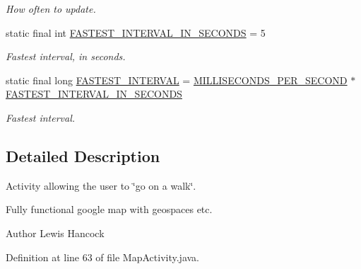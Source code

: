 \begin{DoxyCompactItemize}
\begin{DoxyCompactList}\small\item\em How often to update. \end{DoxyCompactList}\item 
static final int \hyperlink{classuk_1_1ac_1_1swan_1_1digitaltrails_1_1activities_1_1_map_activity_aecc6dab284cde100b271b4247c3ce99a}{F\+A\+S\+T\+E\+S\+T\+\_\+\+I\+N\+T\+E\+R\+V\+A\+L\+\_\+\+I\+N\+\_\+\+S\+E\+C\+O\+N\+D\+S} = 5
\begin{DoxyCompactList}\small\item\em Fastest interval, in seconds. \end{DoxyCompactList}\item 
static final long \hyperlink{classuk_1_1ac_1_1swan_1_1digitaltrails_1_1activities_1_1_map_activity_a76841fbf67877d014b59ce522302003d}{F\+A\+S\+T\+E\+S\+T\+\_\+\+I\+N\+T\+E\+R\+V\+A\+L} = \hyperlink{classuk_1_1ac_1_1swan_1_1digitaltrails_1_1activities_1_1_map_activity_a91c817713b70954a38dd441d84c3e63c}{M\+I\+L\+L\+I\+S\+E\+C\+O\+N\+D\+S\+\_\+\+P\+E\+R\+\_\+\+S\+E\+C\+O\+N\+D} $\ast$ \hyperlink{classuk_1_1ac_1_1swan_1_1digitaltrails_1_1activities_1_1_map_activity_aecc6dab284cde100b271b4247c3ce99a}{F\+A\+S\+T\+E\+S\+T\+\_\+\+I\+N\+T\+E\+R\+V\+A\+L\+\_\+\+I\+N\+\_\+\+S\+E\+C\+O\+N\+D\+S}
\begin{DoxyCompactList}\small\item\em Fastest interval. \end{DoxyCompactList}\end{DoxyCompactItemize}


\subsection{Detailed Description}
Activity allowing the user to \char`\"{}go on a walk\char`\"{}. 

Fully functional google map with geospaces etc. \begin{DoxyAuthor}{Author}
Lewis Hancock 
\end{DoxyAuthor}


Definition at line 63 of file Map\+Activity.\+java.



